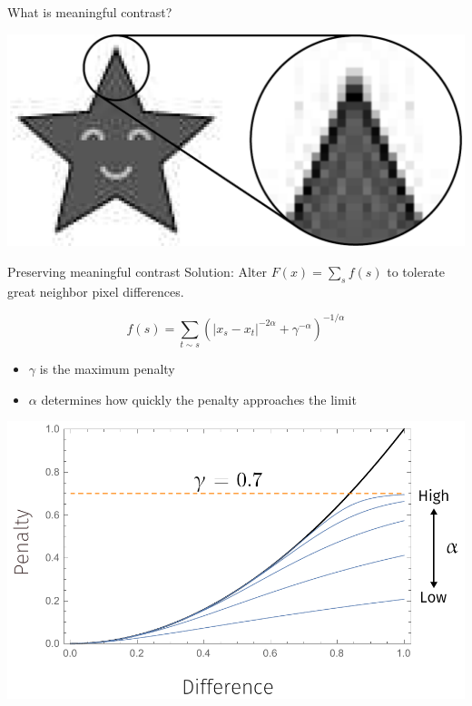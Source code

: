 \documentclass[10pt]{beamer}
\begin{document}
\begin{frame}{What is meaningful contrast?}

\begin{center}
\includegraphics[scale=0.5]{img/noise_closeup}
\end{center}

\end{frame}

\begin{frame}{Preserving meaningful contrast}
Solution: Alter $F(x)=\sum\limits_{s}f(s)$ to tolerate great neighbor pixel differences.

\pause
\[ f(s) = \sum_{t \sim s} \left(|x_s-x_t|^{-2\alpha} + \gamma^{-\alpha}\right)^{-1/\alpha} \]

\begin{itemize}
\item $\gamma$ is the maximum penalty
\item $\alpha$ determines how quickly the penalty approaches the limit
\end{itemize}

\begin{center}
\includegraphics[width=0.6\linewidth]{img/alphagamma}
\end{center}

\end{frame}
\end{document}
